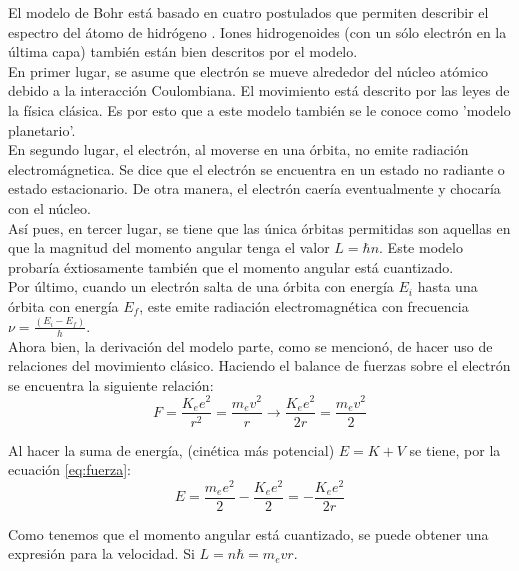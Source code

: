 \documentclass[%
 reprint,
 amsmath,amssymb,
 aps,
]{revtex4-1}
\begin{document}
El modelo de Bohr está basado en cuatro postulados que permiten describir el espectro del átomo de hidrógeno \cite{moderna}. Iones hidrogenoides (con un sólo electrón en la última capa) también están bien descritos por el modelo. \\

En primer lugar, se asume que electrón se mueve alrededor del núcleo atómico debido a la interacción Coulombiana. El movimiento está descrito por las leyes de la física clásica. Es por esto que a este modelo también se le conoce como 'modelo planetario'. \\

En segundo lugar, el electrón, al moverse en una órbita, no emite radiación electromágnetica. Se dice que el electrón se encuentra en un estado no radiante o estado estacionario. De otra manera, el electrón caería eventualmente y chocaría con el núcleo. \\

Así pues, en tercer lugar, se tiene que las única órbitas permitidas son aquellas en que la magnitud del momento angular tenga el valor $ L = \hbar n $. Este modelo probaría éxtiosamente también que el momento angular está cuantizado. \\

Por último, cuando un electrón salta de una órbita con energía $ E_i $ hasta una órbita con energía $ E_f $, este emite radiación electromagnética con frecuencia $ \nu = \frac{(E_i-E_f)}{h} $. \\

Ahora bien, la derivación del modelo parte, como se mencionó, de hacer uso de relaciones del movimiento clásico. Haciendo el balance de fuerzas sobre el electrón se encuentra la siguiente relación:\\

\begin{equation}
F=\frac{K_e e^2}{r^2}=\frac{m_e v^2}{r} \to \frac{K_e e^2}{2r}=\frac{m_e v^2}{2}
\label{eq:fuerza}
\end{equation}

Al hacer la suma de energía, (cinética más potencial) $ E = K + V $ se tiene, por la ecuación \ref{eq:fuerza}:\\

\begin{equation}
E=\frac{m_e e^2}{2}-\frac{K_e e^2}{2} = -\frac{K_e e^2}{2r}
\label{eq:energia}
\end{equation}

Como tenemos que el momento angular está cuantizado, se puede obtener una expresión para la velocidad. Si $ L = n\hbar = m_e vr $.\\
\end{document}

